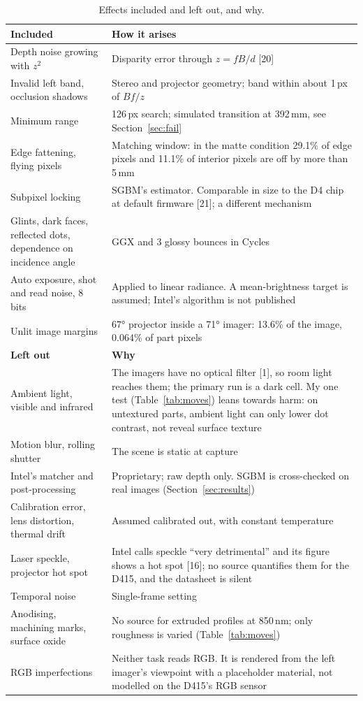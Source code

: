 \documentclass[10pt,a4paper]{article}
\newcommand{\cte}[1]{[#1]}
\begin{document}
\begin{table}[t]
\centering\footnotesize
\caption{Effects included and left out, and why.}\label{tab:effects}
\vspace{-1pt}
\begin{tabularx}{\textwidth}{@{}p{}X@{}}
\toprule
\textbf{Included} & \textbf{How it arises} \\
\midrule
Depth noise growing with $z^2$ & Disparity error through $z=fB/d$ \cte{20} \\
Invalid left band, occlusion shadows & Stereo and projector geometry; band within about 1\,px of $B f/z$ \\
Minimum range & 126\,px search; simulated transition at 392\,mm, see Section~\ref{sec:fail} \\
Edge fattening, flying pixels & Matching window: in the matte condition 29.1\% of edge pixels and 11.1\% of interior pixels are off by more than 5\,mm \\
Subpixel locking & SGBM's estimator. Comparable in size to the D4 chip at default firmware \cte{21}; a different mechanism \\
Glints, dark faces, reflected dots, dependence on incidence angle & GGX and 3 glossy bounces in Cycles \\
Auto exposure, shot and read noise, 8 bits & Applied to linear radiance. A mean-brightness target is assumed; Intel's algorithm is not published \\
Unlit image margins & 67° projector inside a 71° imager: 13.6\% of the image, 0.064\% of part pixels \\
\midrule
\textbf{Left out} & \textbf{Why} \\
\midrule
Ambient light, visible and infrared & The imagers have no optical filter \cte{1}, so room light reaches them; the primary run is a dark cell. My one test (Table~\ref{tab:moves}) leans towards harm: on untextured parts, ambient light can only lower dot contrast, not reveal surface texture \\
Motion blur, rolling shutter & The scene is static at capture \\
Intel's matcher and post-processing & Proprietary; raw depth only. SGBM is cross-checked on real images (Section~\ref{sec:results}) \\
Calibration error, lens distortion, thermal drift & Assumed calibrated out, with constant temperature \\
Laser speckle, projector hot spot & Intel calls speckle ``very detrimental'' and its figure shows a hot spot \cte{16}; no source quantifies them for the D415, and the datasheet is silent \\
Temporal noise & Single-frame setting \\
Anodising, machining marks, surface oxide & No source for extruded profiles at 850\,nm; only roughness is varied (Table~\ref{tab:moves}) \\
RGB imperfections & Neither task reads RGB. It is rendered from the left imager's viewpoint with a placeholder material, not modelled on the D415's RGB sensor \\
\bottomrule
\end{tabularx}
\end{table}
\end{document}
